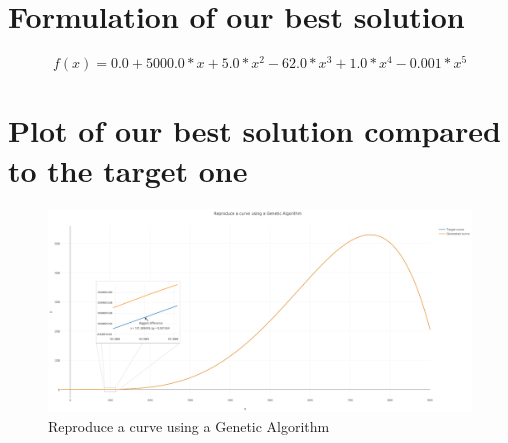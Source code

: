 \documentclass[12pt]{article}
\begin{document}
\section{Formulation of our best solution}

$$f(x) = 0.0 + 5000.0*x + 5.0*x^2 - 62.0*x^3 + 1.0*x^4 - 0.001*x^5$$

\section{Plot of our best solution compared to the target one}

\begin{figure}[H]
	\centering
	\includegraphics[width=1.0\columnwidth]{./plot_solution.png}
	\caption{Reproduce a curve using a Genetic Algorithm}
\end{figure}
\end{document}
